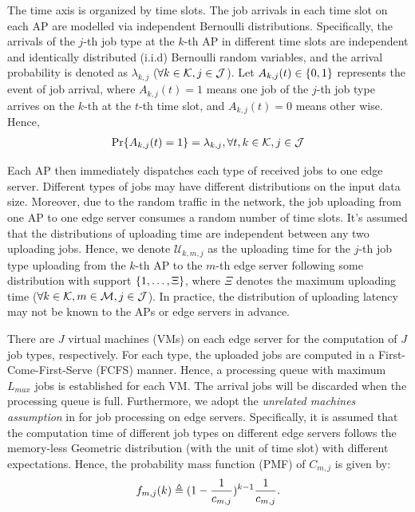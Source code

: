 The time axis is organized by time slots.
The job arrivals in each time slot on each AP are modelled via independent Bernoulli distributions.
Specifically, the arrivals of the $j$-th job type at the $k$-th AP in different time slots are independent and identically distributed (i.i.d) Bernoulli random variables, and the arrival probability is denoted as $\lambda_{k,j}$ ($\forall k\in\mathcal{K}, j\in\mathcal{J}$).
Let $A_{k,j}(t) \in \{0,1\}$ represents the event of job arrival, where $A_{k,j}(t)=1$ means one job of the $j$-th job type arrives on the $k$-th at the $t$-th time slot, and $A_{k,j}(t)=0$ means other wise.
Hence,
\begin{align}
    \Pr\{ A_{k,j}(t) = 1 \} = \lambda_{k,j}, \forall t,k\in\mathcal{K},j\in\mathcal{J}
\end{align}

Each AP then immediately dispatches each type of received jobs to one edge server.
Different types of jobs may have different distributions on the input data size.
Moreover, due to the random traffic in the network, the job uploading from one AP to one edge server consumes a random number of time slots.
It's assumed that the distributions of uploading time are independent between any two uploading jobs.
Hence, we denote $\mathcal{U}_{k,m,j}$ as the uploading time for the $j$-th job type uploading from the $k$-th AP to the $m$-th edge server following some distribution with support $\{1, \dots, \Xi\}$, where $\Xi$ denotes the maximum uploading time ($\forall k\in\mathcal{K}, m\in\mathcal{M}, j\in\mathcal{J}$).
In practice, the distribution of uploading latency may not be known to the APs or edge servers in advance.

There are $J$ virtual machines (VMs) on each edge server for the computation of $J$ job types, respectively.
For each type, the uploaded jobs are computed in a First-Come-First-Serve (FCFS) manner.
Hence, a processing queue with maximum $L_{max}$ jobs is established for each VM.
The arrival jobs will be discarded when the processing queue is full.
Furthermore, we adopt the \emph{unrelated machines assumption} in \cite{tan-online} for job processing on edge servers.
Specifically, it is assumed that the computation time of different job types on different edge servers follows the memory-less Geometric distribution (with the unit of time slot) with different expectations.
Hence, the probability mass function (PMF) of $C_{m,j}$ is given by:
\begin{align}
    f_{m,j}(k) \triangleq (1-\frac{1}{c_{m,j}})^{k-1} \frac{1}{c_{m,j}}.
\end{align}

